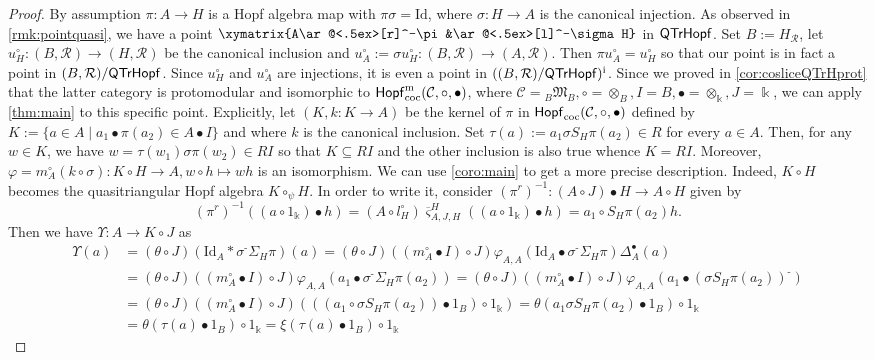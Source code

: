 \documentclass[nosumlimits,twoside]{amsart}
\theoremstyle{definition}
\theoremstyle{remark}
\def\revsn{\text{-}}
\newcommand{\id}{\mathrm{Id}}
\newcommand{\Cc}{\mathcal{C}}
\newcommand{\Rr}{\mathcal{R}}
\newcommand{\ot}{\otimes}
\def\cHopfmon{{\sf Hopf}_{\mathrm{coc}}}
\def\QTrHopf{{\sf QTrHopf}}
\begin{document}
\begin{proof}
By assumption $\pi:A\to H$ is a Hopf algebra map with $\pi\sigma=\id$, where $\sigma:H\to A$ is the canonical injection. As observed in \cref{rmk:pointquasi}, we have a point $\xymatrix{A\ar@<.5ex>[r]^-\pi&\ar@<.5ex>[l]^-\sigma H}$ in $\QTrHopf$. Set $B:=H_{\Rr}$, let $u_H^\circ:(B,\Rr)\to(H,\Rr)$ be the canonical inclusion and $u_A^\circ:=\sigma u_H^\circ:(B,\Rr)\to(A,\Rr)$. Then $\pi u_A^\circ=u_H^\circ$ so that our point is in fact a point in $(B,\Rr)/\QTrHopf$. Since $u_H^\circ$ and $u_A^\circ$ are injections, it is even a point in $((B,\Rr)/\QTrHopf)^{\mathrm{i}}$. Since we proved in \cref{cor:cosliceQTrHprot} that the latter category is protomodular and isomorphic to $\cHopfmon^\mathrm{m}(\Cc,\circ,\bullet)$, where $\Cc={}_B\mathfrak{M}_B,\circ=\ot_B,I=B,\bullet=\ot_\Bbbk, J=\Bbbk$, we can apply \cref{thm:main} to this specific point. Explicitly, let $(K,k:K\to A)$ be the kernel of $\pi$ in $\cHopfmon(\Cc,\circ,\bullet)$ defined by $K:=\{a\in A\mid a_1\bullet\pi(a_2)\in A\bullet I\}$ and where $k$ is the canonical inclusion.
Set $\tau(a):=a_1\sigma S_H\pi(a_2)\in R$ for every $a\in A$. Then, for any $w\in K$, we have $w=\tau(w_1)\sigma\pi(w_2)\in RI$ so that $K\subseteq RI$ and the other inclusion is also true whence $K=RI.$
Moreover, $\varphi=m_A^\circ(k\circ\sigma):K\circ H\to A,w\circ h\mapsto wh$ is an isomorphism. We can use \cref{coro:main} to get a more precise description. Indeed, $K\circ H$ becomes the quasitriangular Hopf algebra $K\circ_\psi H$. In order to write it, consider
$(\pi^r)^{-1}:(A\circ J)\bullet H\to A\circ H$ given by
\[(\pi^r)^{-1}((a\circ 1_\Bbbk)\bullet h)=(A\circ l_H^\circ)\overline{\varsigma}_{A,J,H}^H((a\circ 1_\Bbbk)\bullet h)
=a_1\circ S_H\pi(a_2)h.\] Then we have
$\Upsilon:A\to K\circ J$ as
\begin{align*}
\Upsilon(a)&=(\theta\circ J)(\id_A*\sigma^\revsn\Sigma_H\pi)(a)
=(\theta\circ J)((m_A^\circ\bullet I)\circ J)\varphi_{A,A}(\id_A\bullet \sigma^\revsn\Sigma_H\pi)\Delta^\bullet_A(a)\\
&=(\theta\circ J)((m_A^\circ\bullet I)\circ J)\varphi_{A,A}(a_1\bullet \sigma^\revsn\Sigma_H\pi(a_2))
=(\theta\circ J)((m_A^\circ\bullet I)\circ J)\varphi_{A,A}(a_1\bullet (\sigma S_H\pi(a_2))^\revsn)\\
&=(\theta\circ J)((m_A^\circ\bullet I)\circ J)(((a_1\circ \sigma S_H\pi(a_2))\bullet 1_B)\circ 1_{\Bbbk})=\theta (a_1\sigma S_H\pi(a_2)\bullet 1_B)\circ 1_\Bbbk\\
&=\theta (\tau(a)\bullet 1_B)\circ 1_\Bbbk
=\xi (\tau(a)\bullet 1_B)\circ 1_\Bbbk

\end{align*}
\end{proof}
\end{document}
